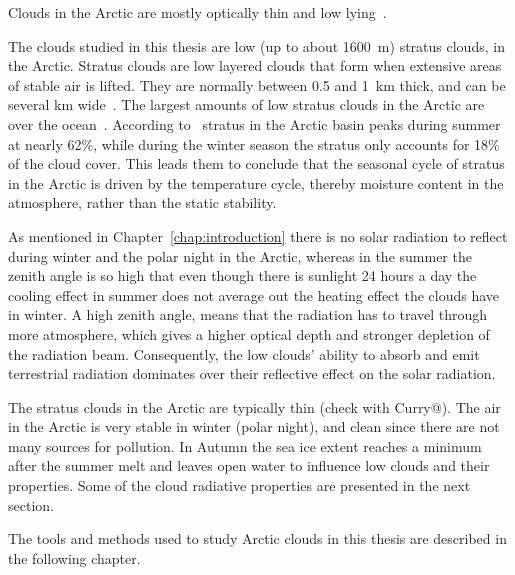 Clouds in the Arctic are mostly optically thin and low lying~\citep{Curry1996}.


The clouds studied in this thesis are low (up to about 1600~m) stratus clouds, in the Arctic. Stratus clouds are low layered clouds that form when extensive areas of stable air is lifted. They are normally between 0.5 and 1~km thick, and can be several km wide~\citep{Aguado2010}. The largest amounts of low stratus clouds in the Arctic are over the ocean~\citep{Klein1993}.
According to~\citet{Klein1993} stratus in the Arctic basin peaks during summer at nearly 62\%, while during the winter season the stratus only accounts for 18\% of the cloud cover. This leads them to conclude that the seasonal cycle of stratus in the Arctic is driven by the temperature cycle, thereby moisture content in the atmosphere, rather than the static stability.

As mentioned in Chapter~\ref{chap:introduction} there is no solar radiation to reflect during winter and the polar night in the Arctic, whereas in the summer the zenith angle is so high that even though there is sunlight 24 hours a day the cooling effect in summer does not average out the heating effect the clouds have in winter. A high zenith angle, means that the radiation has to travel through more atmosphere, which gives a higher optical depth and stronger depletion of the radiation beam. Consequently, the low clouds' ability to absorb and emit terrestrial radiation dominates over their reflective effect on the solar radiation.


The stratus clouds in the Arctic are typically thin (check with Curry@).
The air in the Arctic is very stable in winter (polar night), and clean since there are not many sources for pollution. In Autumn the sea ice extent reaches a minimum after the summer melt and leaves open water to influence low clouds and their properties. Some of the cloud radiative properties  are presented in the next section.

The tools and methods used to study Arctic clouds in this thesis are described in the following chapter.
